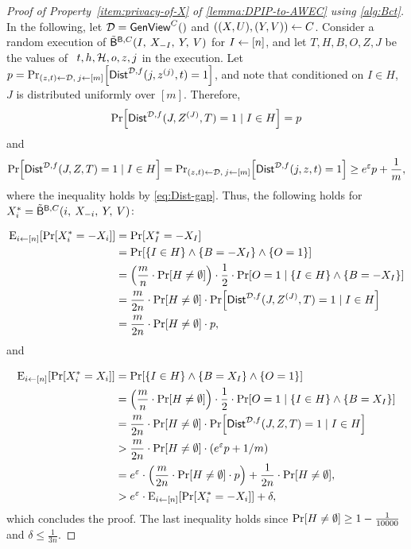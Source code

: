 \begin{proof}[Proof of Property~\ref{item:privacy-of-X} of \cref{lemma:DPIP-to-AWEC} using \cref{alg:Bct}]
	
In the following, let ${\cal D} = \mathsf{GenView}^C()$ and $((X,U),(Y,V)) \gets C$. Consider a random execution of ${\tilde{\mathsf{B}}}^{\mathsf{B}, C}(I,\: X_{-I}, \: Y, \: V)$ for $I \gets [n]$, and let $T, H, B, O, Z, J$ be the values of $\:\: t, h,{\cal H},o, z, j$ in the execution. 
Let $p = \ppr{(z,t) \la \cD, \: j \la [m]}{\Dist^{\cD,f}(j ,z^{(j)}, t) = 1}$, and note that conditioned on $I \in H$, $J$ is distributed uniformly over $[m]$. Therefore,
$$\pr{\Dist^{\cD,f}(J, Z^{(J)}, T) = 1 \mid I \in H} = p$$ and $$\pr{\Dist^{\cD,f}(J, Z, T) = 1 \mid I \in H} = \ppr{(z,t) \la \cD, \: j \la [m]}{\Dist^{\cD,f}(j ,z, t) = 1} \geq e^\eps p + \frac1m,$$ where the inequality holds by \cref{eq:Dist-gap}.
Thus, the following holds for $X^*_i = {\tilde{\mathsf{B}}}^{\mathsf{B}, C}(i,\: X_{-i}, \: Y, \: V)$:


\begin{align*}
	\eex{i \la [n]}{\pr{X^*_i = -X_i}}
	&= \pr{X_I^* = -X_I}\\
	&=\pr{\set{I \in H} \land \set{B = -X_I} \land \set{O=1}}\\
	&= \paren{\frac{m}{n}\cdot \pr{H \neq \emptyset}} \cdot \frac12 \cdot  \pr{O=1 \mid \set{I \in H}\land \set{B = -X_I}}\\
	&= \frac{m}{2n} \cdot \pr{H \neq \emptyset} \cdot \pr{\Dist^{\cD,f}(J, Z^{(J)}, T) = 1 \mid I \in H}\\
	&= \frac{m}{2n} \cdot \pr{H \neq \emptyset} \cdot p,
\end{align*}
 and 

\begin{align*}
	\eex{i \la [n]}{\pr{X^*_i = X_i}}
	&=\pr{\set{I \in H} \land \set{B = X_I} \land \set{O=1}}\\
	&= \paren{\frac{m}{n}\cdot \pr{H \neq \emptyset}} \cdot \frac12 \cdot  \pr{O=1 \mid \set{I \in H}\land \set{B = X_I}}\\
	&= \frac{m}{2n} \cdot \pr{H \neq \emptyset} \cdot\pr{\Dist^{\cD,f}(J, Z, T) = 1 \mid I \in H}\\
	&> \frac{m}{2n}  \cdot \pr{H \neq \emptyset} \cdot (e^{\eps} p + 1/m)\\
	&= e^{\eps} \cdot \paren{\frac{m}{2n}  \cdot \pr{H \neq \emptyset} \cdot p} + \frac{1}{2n}\cdot \pr{H \neq \emptyset},\\
	&>  e^{\eps} \cdot \eex{i \la [n]}{\pr{X^*_i = -X_i}} + \delta,
\end{align*}
which concludes the proof. The last inequality holds since $\pr{H \neq \emptyset} \geq 1-\frac1{10000}$ and $\delta \leq \frac1{3n}$.

\end{proof}

